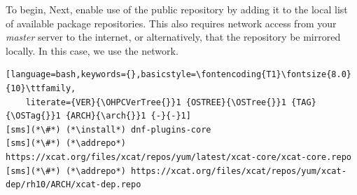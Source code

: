 To begin,
\else
Next,
\fi
enable use of the public \xCAT{} repository by adding it to the local list
of available package repositories. This also requires network access from
your {\em master} server to the internet, or alternatively, that
the repository be mirrored locally. In this case, we use the network.

\begin{lstlisting}[language=bash,keywords={},basicstyle=\fontencoding{T1}\fontsize{8.0}{10}\ttfamily,
	literate={VER}{\OHPCVerTree{}}1 {OSTREE}{\OSTree{}}1 {TAG}{\OSTag{}}1 {ARCH}{\arch{}}1 {-}{-}1]
[sms](*\#*) (*\install*) dnf-plugins-core
[sms](*\#*) (*\addrepo*) https://xcat.org/files/xcat/repos/yum/latest/xcat-core/xcat-core.repo
[sms](*\#*) (*\addrepo*) https://xcat.org/files/xcat/repos/yum/xcat-dep/rh10/ARCH/xcat-dep.repo
\end{lstlisting}

